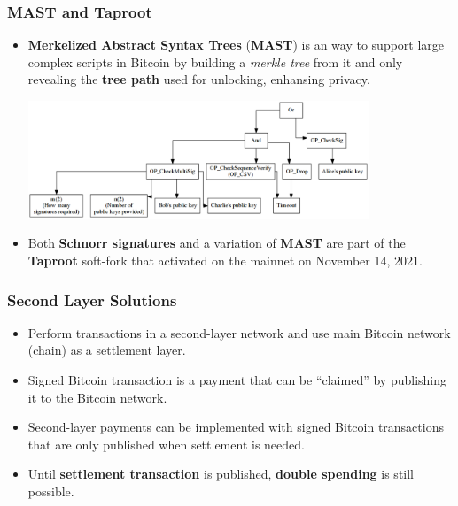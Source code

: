 \documentclass{beamer}
\begin{document}
\begin{frame}
  \frametitle{MAST and Taproot}
  \begin{itemize}
  \item \textbf{Merkelized Abstract Syntax Trees} (\textbf{MAST}) is an way to
    support large complex scripts in Bitcoin by building a \textit{merkle tree}
    from it and only revealing the \textbf{tree path} used for unlocking,
    enhansing privacy.
    \begin{center}
      \includegraphics[width=0.8\textwidth]{mast}
    \end{center}
  \item Both \textbf{Schnorr signatures} and a variation of \textbf{MAST} are
    part of the \textbf{Taproot} soft-fork that activated on the mainnet on
    November 14, 2021.
  \end{itemize}
\end{frame}

\begin{frame}
  \frametitle{Second Layer Solutions}
  \begin{itemize}
  \item Perform transactions in a second-layer network and use main Bitcoin
    network (chain) as a settlement layer.
  \item Signed Bitcoin transaction is a payment that can be ``claimed'' by
    publishing it to the Bitcoin network.
  \item Second-layer payments can be implemented with signed Bitcoin
    transactions that are only published when settlement is needed.
  \item Until \textbf{settlement transaction} is published, \textbf{double
      spending} is still possible.
  \end{itemize}
\end{frame}
\end{document}
